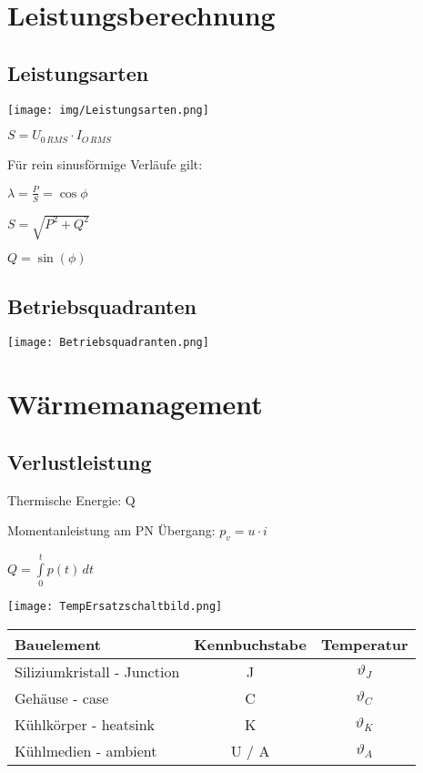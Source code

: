 \documentclass[german]{latex4ei/latex4ei_sheet}
\begin{document}
\section{Leistungsberechnung}
	\begin{sectionbox}
		\subsection{Leistungsarten}
			\begin{bluebox}
				\item \texttt{[image: img/Leistungsarten.png]}
				\item $S = U_{0\,RMS} \cdot I_{O\,RMS}$
				\item Für rein sinusförmige Verläufe gilt:
				\item $\lambda = \frac{P}{S} = \cos \phi$
				\item $S = \sqrt{P^2+Q^2}$
				\item $Q = \sin(\phi)$
			\end{bluebox}
		\subsection{Betriebsquadranten}
			\begin{symbolbox}
				\item \texttt{[image: Betriebsquadranten.png]}
			\end{symbolbox}
	\end{sectionbox}
\section{Wärmemanagement}
	\begin{sectionbox}
		\subsection{Verlustleistung}
			\begin{bluebox}
				\item Thermische Energie: Q
				\item Momentanleistung am PN Übergang: $p_v = u \cdot i$
				\item $Q = \int\limits_0^t p(t)\,dt$
				\item \texttt{[image: TempErsatzschaltbild.png]}
			\end{bluebox}
			\begin{tabular}{|l|c|c|}
				\textbf{Bauelement}	& \textbf{Kennbuchstabe} & \textbf{Temperatur}\\
				\hline
				Siliziumkristall - Junction & J & $\vartheta_J$\\
				Gehäuse - case & C & $\vartheta_C$\\
				Kühlkörper - heatsink & K & $\vartheta_K$\\
				Kühlmedien - ambient & U / A & $\vartheta_A$
				
			\end{tabular}
	\end{sectionbox}
\end{document}

